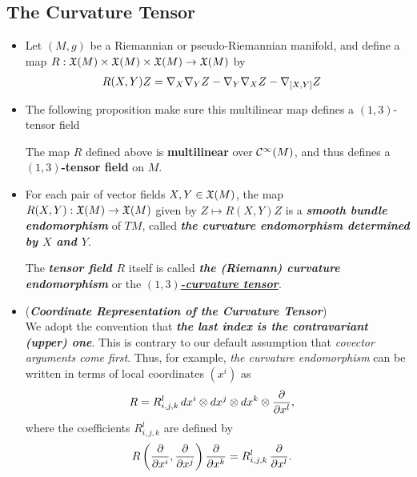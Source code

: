 \documentclass[11pt]{article}
\begin{document}
\subsection{The Curvature Tensor}
\begin{itemize}
\item \begin{definition}
Let $(M,g)$ be a Riemannian or pseudo-Riemannian manifold, and define a map $R: {\mathfrak X}(M) \times {\mathfrak X}(M) \times {\mathfrak X}(M) \rightarrow {\mathfrak X}(M)$ by
\begin{align}
R(X, Y)Z &= \nabla_{X}{\nabla_{Y}{Z}} - \nabla_{Y}{\nabla_{X}{Z}}  -  \nabla_{[X, Y]}{Z} \label{eqn: curvature_def}
\end{align}
\end{definition}

\item The following proposition make sure this multilinear map defines a $(1,3)$-tensor field
\begin{proposition}
The map $R$ defined above is \textbf{multilinear} over ${\mathcal C}^{\infty}(M)$, and thus defines a \textbf{$(1,3)$-tensor field} on $M$.
\end{proposition}

\item \begin{definition}
For each pair of vector fields $X, Y \in {\mathfrak X}(M)$, the map $R(X,Y): {\mathfrak X}(M) \rightarrow {\mathfrak X}(M)$ given by $Z \mapsto R(X,Y)Z$ is a \emph{\textbf{smooth bundle endomorphism}} of $TM$, called \emph{\textbf{the curvature endomorphism determined by $X$ and $Y$}}.

The \emph{\textbf{tensor field $R$}} itself is called \emph{\textbf{the (Riemann) curvature endomorphism}} or the \underline{\emph{\textbf{$(1, 3)$-curvature tensor}}}. 
\end{definition}

\item \begin{remark} (\emph{\textbf{Coordinate Representation of the Curvature Tensor}})\\
We adopt the convention that \emph{\textbf{the last index is the contravariant (upper) one}}. This is contrary to our default assumption that \emph{covector arguments come first}. Thus, for example, \emph{the curvature endomorphism} can be written in terms of local coordinates $(x^i)$ as
\begin{align*}
R &= R_{i,j,k}^{l}\,dx^i \otimes dx^j \otimes dx^k \otimes \frac{\partial }{ \partial x^l},
\end{align*} where the coefficients $R_{i,j,k}^{l}$ are defined by
\begin{align*}
R\left(\frac{\partial }{ \partial x^i}, \frac{\partial }{ \partial x^j}\right)\frac{\partial }{ \partial x^k} &= R_{i,j,k}^{l}\, \frac{\partial }{ \partial x^l}.
\end{align*}
\end{remark}


\end{itemize}
\end{document}
